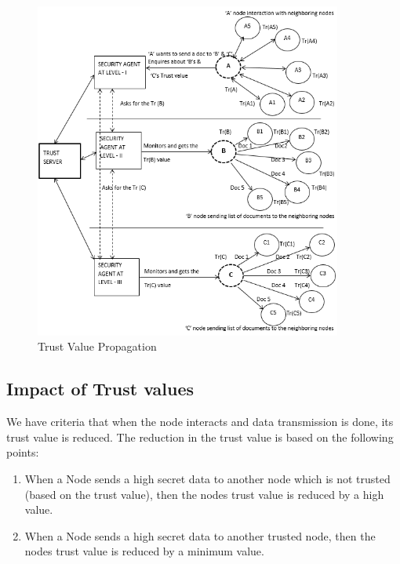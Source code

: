 \begin{figure}[h!]
    \begin{center}
        \includegraphics[width=0.90\textwidth]{Figures/Trust_Propagation_Diagram.PNG}
        \caption{Trust Value Propagation}
        \label{fig:TrustTransmission}
    \end{center}
\end{figure}

\subsection{Impact of Trust values}
We have criteria that when the node interacts and data transmission is done, its trust value is
reduced. The reduction in the trust value is based on the following points:
\begin{enumerate}
    \item When a Node sends a high secret data to another node which is not trusted (based on
the trust value), then the nodes trust value is reduced by a high value.
    \item When a Node sends a high secret data to another trusted node, then the nodes trust
value is reduced by a minimum value.
\end{enumerate}

